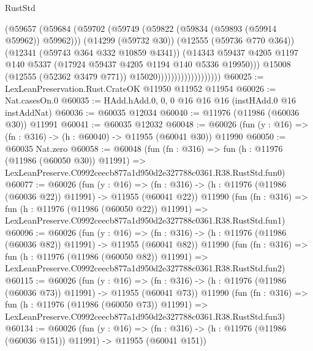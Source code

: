 \begin{lexlean}{RustStd}
\begin{coremodule}
                                      (@59657
                                        (@59684
                                          (@59702
                                            (@59749
                                              (@59822 (@59834 (@59893 (@59914 @59962)) @59962)))
                                            (@14299 (@59732 @30))
                                            (@12555 (@59736 @770 @364))
                                            (@12341 (@59743 @364 @332 @10859 @4341))
                                            (@14343
                                              @59437
                                              @4205
                                              @1197
                                              @140
                                              @5337
                                              (@17924 @59437 @4205 @1194 @140 @5336 @19950)))
                                          @15008
                                          (@12555 (@52362 @3479 @771))
                                          @15020)))))))))))))))))))
@60025 := LexLeanPreservation.Rust.CrateOK @11950 @11952 @11954
@60026 := Nat.casesOn.{0}
@60035 := HAdd.hAdd.{0, 0, 0} @16 @16 @16 (instHAdd.{0} @16 instAddNat)
@60036 := @60035 @12034
@60040 := @11976 (@11986 (@60036 @30)) @11991
@60041 := @60035 @12032
@60048 := @60026 (fun (y : @16) => (fn : @316) -> (h : @60040) -> @11955 (@60041 @30)) @11990
@60050 := @60035 Nat.zero
@60058 := @60048
    (fun (fn : @316) =>
    fun (h : @11976 (@11986 (@60050 @30)) @11991) =>
    LexLeanPreserve.C0992ceecb877a1d950d2e327788c0361.R38.RustStd.fun0)
@60077 := @60026
    (fun (y : @16) =>
    (fn : @316) -> (h : @11976 (@11986 (@60036 @22)) @11991) -> @11955 (@60041 @22))
    @11990
    (fun (fn : @316) =>
    fun (h : @11976 (@11986 (@60050 @22)) @11991) =>
    LexLeanPreserve.C0992ceecb877a1d950d2e327788c0361.R38.RustStd.fun1)
@60096 := @60026
    (fun (y : @16) =>
    (fn : @316) -> (h : @11976 (@11986 (@60036 @82)) @11991) -> @11955 (@60041 @82))
    @11990
    (fun (fn : @316) =>
    fun (h : @11976 (@11986 (@60050 @82)) @11991) =>
    LexLeanPreserve.C0992ceecb877a1d950d2e327788c0361.R38.RustStd.fun2)
@60115 := @60026
    (fun (y : @16) =>
    (fn : @316) -> (h : @11976 (@11986 (@60036 @73)) @11991) -> @11955 (@60041 @73))
    @11990
    (fun (fn : @316) =>
    fun (h : @11976 (@11986 (@60050 @73)) @11991) =>
    LexLeanPreserve.C0992ceecb877a1d950d2e327788c0361.R38.RustStd.fun3)
@60134 := @60026
    (fun (y : @16) =>
    (fn : @316) -> (h : @11976 (@11986 (@60036 @151)) @11991) -> @11955 (@60041 @151))

\end{coremodule}
\end{lexlean}
